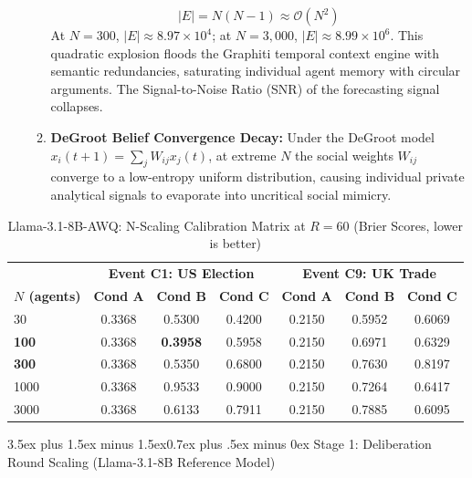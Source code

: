 \documentclass[11pt,journal,onecolumn]{IEEEtran}
\makeatletter
\renewcommand\subsection{\@startsection{subsection}{2}{\z@}%
  {3.5ex plus 1.5ex minus 1.5ex}{0.7ex plus .5ex minus 0ex}%
  {\normalfont\normalsize\bfseries}}
\makeatother
\begin{document}
\begin{itemize}
\begin{enumerate}
            \begin{equation}
                |E| = N(N - 1) \approx \mathcal{O}(N^2)
            \end{equation}
            At $N=300$, $|E| \approx 8.97 \times 10^4$; at $N=3{,}000$, $|E| \approx 8.99 \times 10^6$. This quadratic explosion floods the Graphiti temporal context engine with semantic redundancies, saturating individual agent memory with circular arguments. The Signal-to-Noise Ratio (SNR) of the forecasting signal collapses.
            \item \textbf{DeGroot Belief Convergence Decay:} Under the DeGroot model $x_i(t+1) = \sum_j W_{ij} x_j(t)$, at extreme $N$ the social weights $W_{ij}$ converge to a low-entropy uniform distribution, causing individual private analytical signals to evaporate into uncritical social mimicry.
        \end{enumerate}
\end{itemize}

\begin{table}[!htbp]
\centering
\caption{Llama-3.1-8B-AWQ: N-Scaling Calibration Matrix at $R=60$ (Brier Scores, lower is better)}
\label{tab:n_sweep_results}
\begin{tabular}{lcccccc}
\toprule
 & \multicolumn{3}{c}{\textbf{Event C1: US Election}} & \multicolumn{3}{c}{\textbf{Event C9: UK Trade}} \\
\cmidrule(r){2-4} \cmidrule(l){5-7}
\textbf{$N$ (agents)} & \textbf{Cond A} & \textbf{Cond B} & \textbf{Cond C} & \textbf{Cond A} & \textbf{Cond B} & \textbf{Cond C} \\
\midrule
30      & 0.3368 & 0.5300 & 0.4200 & 0.2150 & 0.5952 & 0.6069 \\
\textbf{100}     & 0.3368 & \textbf{0.3958} & 0.5958 & 0.2150 & 0.6971 & 0.6329 \\
\textbf{300}     & 0.3368 & 0.5350 & 0.6800 & 0.2150 & 0.7630 & 0.8197 \\
1000    & 0.3368 & 0.9533 & 0.9000 & 0.2150 & 0.7264 & 0.6417 \\
3000    & 0.3368 & 0.6133 & 0.7911 & 0.2150 & 0.7885 & 0.6095 \\
\bottomrule
\end{tabular}
\setlength{\tabcolsep}{6pt}
\end{table}

\subsection{Stage 1: Deliberation Round Scaling (Llama-3.1-8B Reference Model)}
\label{sec:r_scaling}
\end{document}
